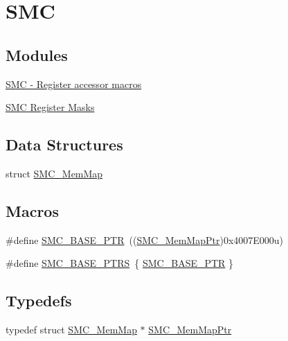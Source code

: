 \hypertarget{group___s_m_c___peripheral}{}\section{S\+M\+C}
\label{group___s_m_c___peripheral}
\subsection*{Modules}
\begin{DoxyCompactItemize}
\item 
\hyperlink{group___s_m_c___register___accessor___macros}{S\+M\+C -\/ Register accessor macros}
\item 
\hyperlink{group___s_m_c___register___masks}{S\+M\+C Register Masks}
\end{DoxyCompactItemize}
\subsection*{Data Structures}
\begin{DoxyCompactItemize}
\item 
struct \hyperlink{struct_s_m_c___mem_map}{S\+M\+C\+\_\+\+Mem\+Map}
\end{DoxyCompactItemize}
\subsection*{Macros}
\begin{DoxyCompactItemize}
\item 
\#define \hyperlink{group___s_m_c___peripheral_ga31b6c4571795341e6446800243313e56}{S\+M\+C\+\_\+\+B\+A\+S\+E\+\_\+\+P\+T\+R}~((\hyperlink{group___s_m_c___peripheral_ga763f87a6b8ebab7acb6dde639e6a47c7}{S\+M\+C\+\_\+\+Mem\+Map\+Ptr})0x4007\+E000u)
\item 
\#define \hyperlink{group___s_m_c___peripheral_gae583f3f0917ee513adcac36dd042a5f3}{S\+M\+C\+\_\+\+B\+A\+S\+E\+\_\+\+P\+T\+R\+S}~\{ \hyperlink{group___s_m_c___peripheral_ga31b6c4571795341e6446800243313e56}{S\+M\+C\+\_\+\+B\+A\+S\+E\+\_\+\+P\+T\+R} \}
\end{DoxyCompactItemize}
\subsection*{Typedefs}
\begin{DoxyCompactItemize}
\item 
typedef struct \hyperlink{struct_s_m_c___mem_map}{S\+M\+C\+\_\+\+Mem\+Map} $\ast$ \hyperlink{group___s_m_c___peripheral_ga763f87a6b8ebab7acb6dde639e6a47c7}{S\+M\+C\+\_\+\+Mem\+Map\+Ptr}
\end{DoxyCompactItemize}


